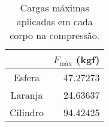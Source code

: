 \begin{table}[H]
\centering
\begin{tabular}{c|r|}
\cline{2-2}
\multicolumn{1}{l|}{} & \multicolumn{1}{c|}{$F_{\textrm{máx}}$ (kgf)} \\ \hline
\multicolumn{1}{|c|}{Esfera} & 47.27273 \\ \hline
\multicolumn{1}{|c|}{Laranja} & 24.63637 \\ \hline
\multicolumn{1}{|c|}{Cilindro} & 94.42425 \\ \hline
\end{tabular}
\caption{Cargas máximas aplicadas em cada corpo na compressão.}
\label{tab:load}
\end{table}